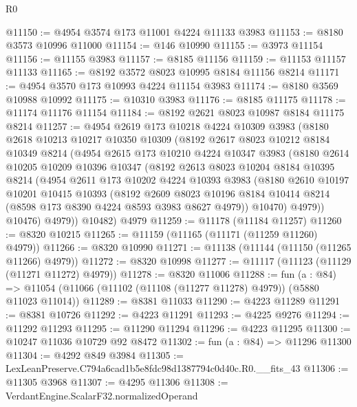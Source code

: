 \begin{lexlean}{R0}
\begin{coremodule}
@11150 := @4954 @3574 @173 @11001 @4224 @11133 @3983
@11153 := @8180 @3573 @10996 @11000
@11154 := @146 @10990
@11155 := @3973 @11154
@11156 := @11155 @3983
@11157 := @8185 @11156
@11159 := @11153 @11157 @11133
@11165 := @8192 @3572 @8023 @10995 @8184 @11156 @8214
@11171 := @4954 @3570 @173 @10993 @4224 @11154 @3983
@11174 := @8180 @3569 @10988 @10992
@11175 := @10310 @3983
@11176 := @8185 @11175
@11178 := @11174 @11176 @11154
@11184 := @8192 @2621 @8023 @10987 @8184 @11175 @8214
@11257 := @4954
    @2619
    @173
    @10218
    @4224
    @10309
    @3983
    (@8180
      @2618
      @10213
      @10217
      @10350
      @10309
      (@8192
        @2617
        @8023
        @10212
        @8184
        @10349
        @8214
        (@4954
          @2615
          @173
          @10210
          @4224
          @10347
          @3983
          (@8180
            @2614
            @10205
            @10209
            @10396
            @10347
            (@8192
              @2613
              @8023
              @10204
              @8184
              @10395
              @8214
              (@4954
                @2611
                @173
                @10202
                @4224
                @10393
                @3983
                (@8180
                  @2610
                  @10197
                  @10201
                  @10415
                  @10393
                  (@8192
                    @2609
                    @8023
                    @10196
                    @8184
                    @10414
                    @8214
                    (@8598 @173 @8390 @4224 @8593 @3983 @8627 @4979))
                  @10470)
                @4979))
            @10476)
          @4979))
      @10482)
    @4979
@11259 := @11178 (@11184 @11257)
@11260 := @8320 @10215
@11265 := @11159 (@11165 (@11171 (@11259 @11260) @4979))
@11266 := @8320 @10990
@11271 := @11138 (@11144 (@11150 (@11265 @11266) @4979))
@11272 := @8320 @10998
@11277 := @11117 (@11123 (@11129 (@11271 @11272) @4979))
@11278 := @8320 @11006
@11288 := fun (a : @84) =>
  @11054 (@11066 (@11102 (@11108 (@11277 @11278) @4979)) (@5880 @11023 @11014))
@11289 := @8381 @11033
@11290 := @4223 @11289
@11291 := @8381 @10726
@11292 := @4223 @11291
@11293 := @4225 @9276
@11294 := @11292 @11293
@11295 := @11290 @11294
@11296 := @4223 @11295
@11300 := @10247 @11036 @10729 @92 @8472
@11302 := fun (a : @84) => @11296 @11300
@11304 := @4292 @849 @3984
@11305 := LexLeanPreserve.C794a6cad1b5e8fdc98d1387794c0d40c.R0.__fits_43
@11306 := @11305 @3968
@11307 := @4295 @11306
@11308 := VerdantEngine.ScalarF32.normalizedOperand

\end{coremodule}
\end{lexlean}
